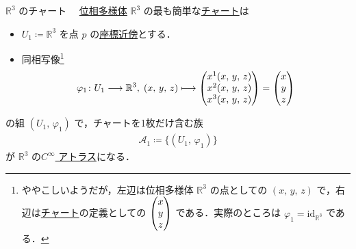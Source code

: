 \documentclass[geometry_main]{subfiles}
\begin{document}
\begin{myexample}[]{$\mathbb{R}^3$ のチャート}
	　\hyperref[def.topomani]{位相多様体} $\mathbb{R}^3$ の最も簡単な\hyperref[def.localcoord]{チャート}は
	\begin{itemize}
		\item $U_1 \coloneqq \mathbb{R}^3$ を点 $p$ の\hyperref[def.localcoord]{座標近傍}とする．
		\item 同相写像\footnote{ややこしいようだが，左辺は位相多様体 $\mathbb{R}^3$ の点としての $(x,\, y,\, z)$ で，右辺は\hyperref[def.localcoord]{チャート}の定義としての $\mqty(x \\ y \\ z)$ である．実際のところは $\varphi_1 = \mathrm{id}_{\mathbb{R}^3}$ である．}
		\begin{align}
			\varphi_1 \colon U_1 \lto \mathbb{R}^3,\;
			(x,\, y,\, z) \lmto \mqty(x^1(x,\, y,\, z) \\ x^2(x,\, y,\, z) \\ x^3(x,\, y,\, z)) = \mqty(x \\ y \\ z)
		\end{align}
	\end{itemize}
	の組 $(U_1,\, \varphi_1)$ で，チャートを1枚だけ含む族
	\begin{align}
		\mathcal{A}_1 \coloneqq \bigl\{(U_1,\, \varphi_1)\bigr\}
	\end{align}
	が $\mathbb{R}^3$ の\hyperref[def.atlas]{$C^\infty$ アトラス}になる．
	

\end{myexample}
\end{document}
